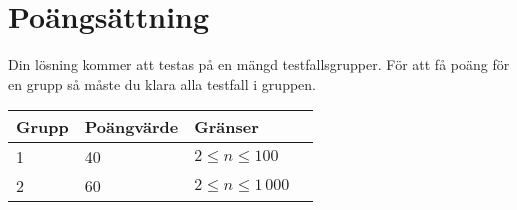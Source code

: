 \section*{Poängsättning}

Din lösning kommer att testas på en mängd testfallsgrupper. För att få poäng för en grupp
så måste du klara alla testfall i gruppen.

\begin{tabular}{| l | l | l | l |}
\hline
Grupp & Poängvärde & Gränser \\ \hline
1     & 40         & $ 2 \le n \le 100$ \\ \hline
2     & 60         & $ 2 \le n \le 1\,000$ \\ \hline
\end{tabular}
